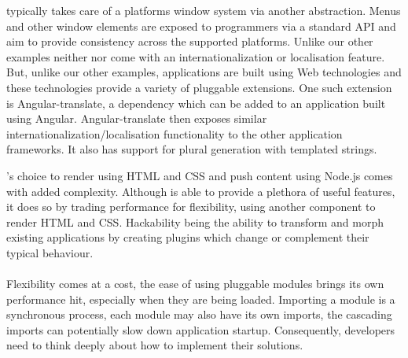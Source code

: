    typically takes care of a platforms window system via another abstraction. Menus\cite{electron_menu} and other window elements are exposed to programmers via a standard API and aim to provide consistency across the supported platforms.
  Unlike our other examples neither  nor  come with an internationalization or localisation feature. But, unlike our other examples,  applications are built using Web technologies and these technologies provide a variety of pluggable extensions. One such extension is Angular-translate, a dependency which can be added to an application built using Angular\cite{angular_translate}. Angular-translate then exposes similar internationalization/localisation functionality to the other application frameworks. It also has support for plural generation with templated strings.

  's choice to render using HTML and CSS and push content using Node.js comes with added complexity. Although  is able to provide a plethora of useful features, it does so by trading performance for flexibility, using another component to render HTML and CSS. Hackability being the ability to transform and morph existing applications by creating plugins which change or complement their typical behaviour.\\\\
  Flexibility comes at a cost, the ease of using pluggable modules brings its own performance hit, especially when they are being loaded. Importing a module is a synchronous process, each module may also have its own imports, the cascading imports can potentially slow down application startup. Consequently, developers need to think deeply about how to implement their solutions.


